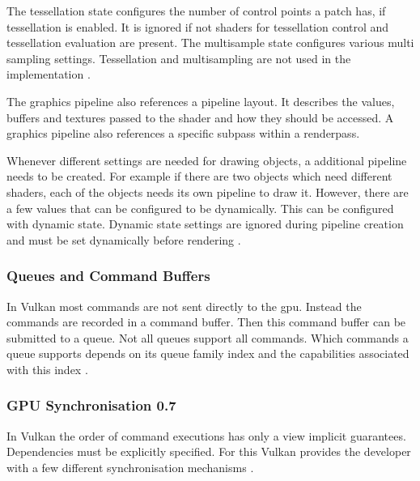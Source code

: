 The tessellation state configures the number of control points a patch has, if tessellation is enabled. It is ignored if not shaders for tessellation control and tessellation evaluation are present. The multisample state configures various multi sampling settings. Tessellation and multisampling are not used in the implementation \cite{khronos:vulkan:spec1.1}.

The graphics pipeline also references a pipeline layout. It describes the values, buffers and textures passed to the shader and how they should be accessed. A graphics pipeline also references a specific subpass within a renderpass\cite{khronos:vulkan:spec1.1}.

Whenever different settings are needed for drawing objects, a additional pipeline needs to be created. For example if there are two objects which need different shaders, each of the objects needs its own pipeline to draw it. However, there are a few values that can be configured to be dynamically. This can be configured with dynamic state. Dynamic state settings are ignored during pipeline creation and must be set dynamically before rendering \cite{khronos:vulkan:spec1.1}.

\subsubsection{Queues and Command Buffers}
In Vulkan most commands are not sent directly to the \gls{gpu}. Instead the commands are recorded in a command buffer. Then this command buffer can be submitted to a queue. Not all queues support all commands. Which commands a queue supports depends on its queue family index and the capabilities associated with this index \cite{khronos:vulkan:spec1.1}.



\subsubsection{GPU Synchronisation 0.7}
In Vulkan the order of command executions has only a view implicit guarantees. Dependencies must be explicitly specified. For this Vulkan provides the developer with a few different synchronisation mechanisms \cite{khronos:vulkan:spec1.1}.


